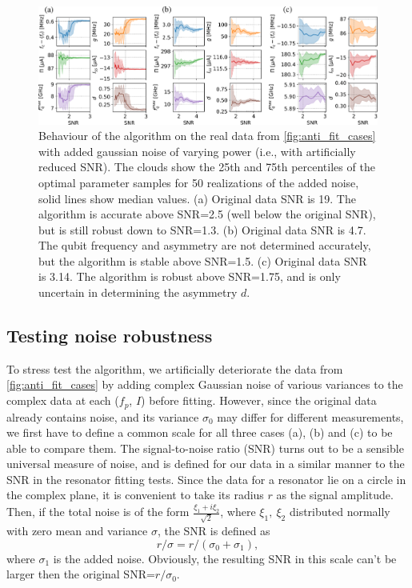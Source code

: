 \documentclass[%
 aip,
 draft,
 amsmath,amssymb,
 reprint,%
]{revtex4-1}
\begin{document}
\begin{figure}
	\centering
	\includegraphics[width=\linewidth]{noise_test}
	\caption{Behaviour of the algorithm on the real data from \autoref{fig:anti_fit_cases} with added gaussian noise of varying power (i.e., with artificially reduced SNR). The clouds show the 25th and 75th percentiles of the optimal parameter samples for 50 realizations of the added noise, solid lines show median values. (a) Original data SNR is 19. The algorithm is accurate above SNR=2.5 (well below the original SNR), but is still robust down to SNR=1.3. (b) Original data SNR is 4.7. The qubit frequency and asymmetry are not determined accurately, but the algorithm is stable above SNR=1.5. (c) Original data SNR is 3.14. The algorithm is robust above SNR=1.75, and is only uncertain in determining the asymmetry $d$.}
	\label{fig:noise_test}
\end{figure}

\subsection{Testing noise robustness}

To stress test the algorithm, we artificially deteriorate the data from \autoref{fig:anti_fit_cases} by adding complex Gaussian noise of various variances to the complex data at each ($f_p$, $I$) before fitting. However, since the original data already contains noise, and its variance $\sigma_0$ may differ for different measurements, we first have to define a common scale for all three cases (a), (b) and (c) to be able to compare them. The signal-to-noise ratio (SNR) turns out to be a sensible universal measure of noise, and is defined for our data in a similar manner to the SNR in the resonator fitting tests\cite{probst2015}. Since the data for a resonator lie on a circle in the complex plane, it is convenient to take its radius $r$ as the signal amplitude. Then, if the total noise is of the form $\frac{\xi_1+i\xi_2}{\sqrt 2}$, where $\xi_1,\ \xi_2$ distributed normally with zero mean and variance $\sigma$, the SNR is defined as 
\begin{equation}
r/\sigma = r/(\sigma_0+\sigma_1),
\label{eq:SNR}
\end{equation}
where $\sigma_1$ is the added noise. Obviously, the resulting SNR in this scale can't be larger then the original SNR=$r/\sigma_0$. 
\end{document}
